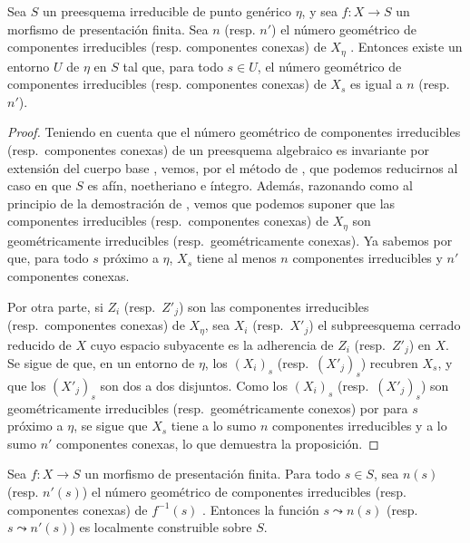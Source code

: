 \begin{proposition}[9.7.8]
\label{IV.9.7.8}
Sea $S$ un preesquema irreducible de punto genérico $\eta$, y sea $f:X\to S$ un morfismo de presentación finita. Sea $n$ \textup{(resp.} $n'$\textup{)} el número geométrico de componentes irreducibles \textup{(resp.} componentes conexas\textup{)} de $X_\eta$ . Entonces existe un entorno $U$ de $\eta$ en $S$ tal que, para todo $s\in U$, el número geométrico de componentes irreducibles \textup{(resp.} componentes conexas\textup{)} de $X_s$ es igual a $n$ \textup{(resp.} $n'$\textup{)}.
\end{proposition}

\begin{proof}
Teniendo en cuenta que el número geométrico de componentes irreducibles (resp.\ componentes conexas) de un preesquema algebraico es invariante por extensión del cuerpo base , vemos, por el método de , que podemos reducirnos al caso en que $S$ es afín, noetheriano e íntegro. Además, razonando como al principio de la demostración de , vemos que podemos suponer que las componentes irreducibles (resp.\ componentes conexas) de $X_\eta$ son geométricamente irreducibles (resp.\ geométricamente conexas). Ya sabemos por  que, para todo $s$ próximo a $\eta$, $X_s$ tiene al menos $n$ componentes irreducibles y $n'$ componentes conexas.

Por otra parte, si $Z_i$ (resp.\ $Z'_j$) son las componentes irreducibles (resp.\ componentes conexas) de $X_\eta$, sea $X_i$ (resp.\ $X'_j$) el subpreesquema cerrado reducido de $X$ cuyo espacio subyacente es la adherencia de $Z_i$ (resp.\ $Z'_j$) en $X$. Se sigue de  que, en un entorno de $\eta$, los $(X_i)_s$ (resp.\ $(X'_j)_s$) recubren $X_s$, y que los $(X'_j)_s$ son dos a dos disjuntos. Como los $(X_i)_s$ (resp.\ $(X'_j)_s$) son geométricamente irreducibles (resp.\ geométricamente conexos) por  para $s$ próximo a $\eta$, se sigue que $X_s$ tiene a lo sumo $n$ componentes irreducibles y a lo sumo $n'$ componentes conexas, lo que demuestra la proposición.
\end{proof}

\begin{corollary}[9.7.9]
\label{IV.9.7.9}
Sea $f:X\to S$ un morfismo de presentación finita. Para todo $s\in S$, sea $n(s)$ \textup{(resp.} $n'(s)$\textup{)} el número geométrico de componentes irreducibles \textup{(resp.} componentes conexas\textup{)} de $f^{-1}(s)$ . Entonces la función $s\leadsto n(s)$ \textup{(resp.} $s\leadsto n'(s)$\textup{)} es localmente construible sobre $S$.
\end{corollary}

